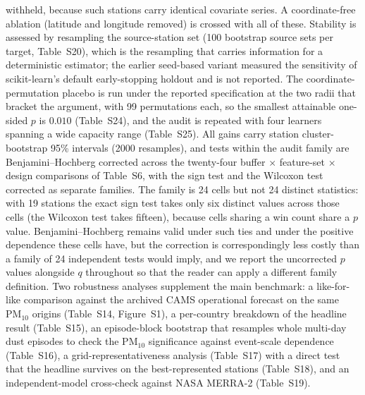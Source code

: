 \documentclass[11pt]{article}
\newcommand*{\pmten}{\ensuremath{\mathrm{PM_{10}}}}
\begin{document}
withheld, because such stations carry identical covariate series. A coordinate-free ablation (latitude and longitude removed) is crossed with all of these. Stability is assessed by resampling the source-station set (100 bootstrap source sets per target, Table~S20), which is the resampling that carries information for a deterministic estimator; the earlier seed-based variant measured the sensitivity of scikit-learn's default early-stopping holdout and is not reported. The coordinate-permutation placebo is run under the reported specification at the two radii that bracket the argument, with 99 permutations each, so the smallest attainable one-sided $p$ is $0.010$ (Table~S24), and the audit is repeated with four learners spanning a wide capacity range (Table~S25). All gains carry station cluster-bootstrap 95\% intervals (2000 resamples), and tests within the audit family are Benjamini--Hochberg corrected across the twenty-four buffer $\times$ feature-set $\times$ design comparisons of Table~S6, with the sign test and the Wilcoxon test corrected as separate families. The family is 24 cells but not 24 distinct statistics: with 19 stations the exact sign test takes only six distinct values across those cells (the Wilcoxon test takes fifteen), because cells sharing a win count share a $p$ value. Benjamini--Hochberg remains valid under such ties and under the positive dependence these cells have, but the correction is correspondingly less costly than a family of 24 independent tests would imply, and we report the uncorrected $p$ values alongside $q$ throughout so that the reader can apply a different family definition. Two robustness analyses supplement the main benchmark: a like-for-like comparison against the archived CAMS operational forecast on the same \pmten{} origins (Table~S14, Figure~S1), a per-country breakdown of the headline result (Table~S15), an episode-block bootstrap that resamples whole multi-day dust episodes to check the \pmten{} significance against event-scale dependence (Table~S16), a grid-representativeness analysis (Table~S17) with a direct test that the headline survives on the best-represented stations (Table~S18), and an independent-model cross-check against NASA MERRA-2 (Table~S19).
\end{document}
